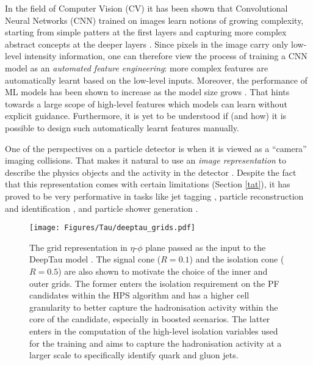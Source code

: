 In the field of Computer Vision (CV) it has been shown that Convolutional Neural Networks (CNN) trained on images learn notions of growing complexity, starting from simple patters at the first layers and capturing more complex abstract concepts at the deeper layers \cite{olah2017feature}. Since pixels in the image carry only low-level intensity information, one can therefore view the process of training a CNN model as an \textit{automated feature engineering}: more complex features are automatically learnt based on the low-level inputs. Moreover, the performance of ML models has been shown to increase as the model size grows \cite{726791,NIPS2012_c399862d,simonyan2014very,szegedy2015going,he2016deep,huang2017densely,tan2019efficientnet}. That hints towards a large scope of high-level features which models can learn without explicit guidance. Furthermore, it is yet to be understood if (and how) it is possible to design such automatically learnt features manually.

One of the perspectives on a particle detector is when it is viewed as a \enquote{camera} imaging collisions. That makes it natural to use an \textit{image representation} to describe the physics objects and the activity in the detector \cite{Cogan:2014oua,deOliveira:2015xxd,Kagan:2020yrm}. Despite the fact that this representation comes with certain limitations (Section \ref{tat}), it has proved to be very performative in tasks like jet tagging \cite{Kasieczka:2019dbj,ATLAS:2017dfg,CMS:2020poo}, particle reconstruction and identification \cite{KM3NeT:2020zod,Collado:2020ehf,Collado:2020fwm,Abbasi:2021ryj}, and particle shower generation \cite{Paganini:2017dwg,Khattak:2021ndw,Buhmann:2021caf}.

\begin{figure}[!t]
    \centering
    \texttt{[image: Figures/Tau/deeptau\_grids.pdf]}
    \caption{The grid representation in $\eta$-$\phi$ plane passed as the input to the DeepTau model \cite{CMS:2022prd}. The signal cone ($R = 0.1$) and the isolation cone ($R = 0.5$) are also shown to motivate the choice of the inner and outer grids. The former enters the isolation requirement on the PF candidates within the HPS algorithm and has a higher cell granularity to better capture the hadronisation activity within the core of the \tauh candidate, especially in boosted scenarios. The latter enters in the computation of the high-level isolation variables used for the training and aims to capture the hadronisation activity at a larger scale to specifically identify quark and gluon jets.}
    \label{fig:deeptau_grid}
\end{figure}


